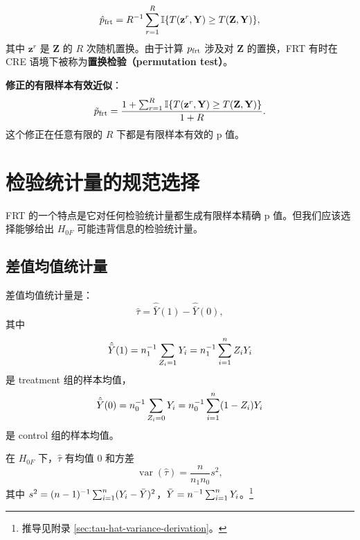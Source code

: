 \begin{equation}
\hat p_{\text{frt}} = R^{-1} \sum_{r=1}^R \mathbb{I}\{T(\mathbf{z}^r,\mathbf{Y}) \geq T(\mathbf{Z},\mathbf{Y})\},
\label{eq:mc-pvalue}
\end{equation}
其中 $\mathbf{z}^r$ 是 $\mathbf{Z}$ 的 $R$ 次随机置换。由于计算 $p_{\text{frt}}$ 涉及对 $\mathbf{Z}$ 的置换，FRT 有时在 CRE 语境下被称为\textbf{置换检验（permutation test）}。

\textbf{修正的有限样本有效近似}：
\begin{equation}
\tilde p_{\text{frt}} = \frac{1 + \sum_{r=1}^R \mathbb{I}\{T(\mathbf{z}^r,\mathbf{Y}) \geq T(\mathbf{Z},\mathbf{Y})\}}{1+R}.
\label{eq:mc-pvalue-corrected}
\end{equation}
这个修正在任意有限的 $R$ 下都是有限样本有效的 p 值。

\section{检验统计量的规范选择}
\label{sec:test-statistics}

FRT 的一个特点是它对任何检验统计量都生成有限样本精确 p 值。但我们应该选择能够给出 $H_{0F}$ 可能违背信息的检验统计量。

\subsection{差值均值统计量}

差值均值统计量是：
\begin{equation}
\hat{\tau} = \hat{\bar{Y}}(1) - \hat{\bar{Y}}(0),
\label{eq:teststatistic}
\end{equation}
其中
\begin{equation}
\hat{\bar{Y}}(1) = n_1^{-1} \sum_{Z_i=1} Y_i = n_1^{-1} \sum_{i=1}^n Z_iY_i
\label{eq:treatment-mean}
\end{equation}
是 treatment 组的样本均值，
\begin{equation}
\hat{\bar{Y}}(0) = n_0^{-1} \sum_{Z_i=0} Y_i = n_0^{-1} \sum_{i=1}^n (1-Z_i) Y_i
\label{eq:control-mean}
\end{equation}
是 control 组的样本均值。

在 $H_{0F}$ 下，$\hat{\tau}$ 有均值 $0$ 和方差
\begin{equation}
\operatorname{var}(\hat{\tau}) = \frac{n}{n_1 n_0} s^2,
\label{eq:tau-hat-variance}
\end{equation}
其中 $s^2 = (n-1)^{-1} \sum_{i=1}^n (Y_i - \bar{Y})^2$，$\bar{Y} = n^{-1} \sum_{i=1}^n Y_i$。\footnote{推导见附录 \cref{sec:tau-hat-variance-derivation}。}

